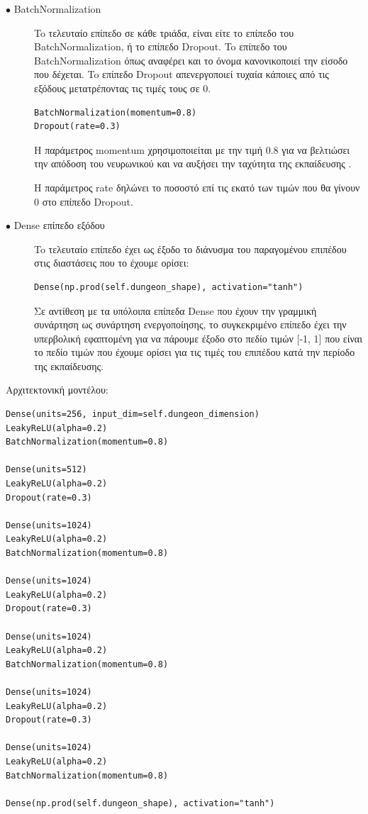 \begin{description}
\item[$\bullet$ BatchNormalization] To τελευταίο επίπεδο σε κάθε τριάδα, είναι είτε το επίπεδο του BatchNormalization, ή το επίπεδο Dropout. To επίπεδο του BatchNormalization όπως αναφέρει και το όνομα κανονικοποιεί την είσοδο που δέχεται. To επίπεδο Dropout απενεργοποιεί τυχαία κάποιες από τις εξόδους μετατρέποντας τις τιμές τους σε 0.
\par
\begin{verbatim}
BatchNormalization(momentum=0.8)
Dropout(rate=0.3)
\end{verbatim}
\par
Η παράμετρος momentum χρησιμοποιείται με την τιμή 0.8 για να βελτιώσει την απόδοση του νευρωνικού και να αυξήσει την ταχύτητα της εκπαίδευσης \cite{firstgan}. 
\par
H παράμετρος rate δηλώνει το ποσοστό επί τις εκατό των τιμών που θα γίνουν 0 στο επίπεδο Dropout.
\end{description}

\begin{description}
\item[$\bullet$ Dense επίπεδο εξόδου] To τελευταίο επίπεδο έχει ως έξοδο το διάνυσμα του παραγομένου επιπέδου στις διαστάσεις που το έχουμε ορίσει:
\par
\begin{verbatim}
Dense(np.prod(self.dungeon_shape), activation="tanh")
\end{verbatim}
\par
Σε αντίθεση με τα υπόλοιπα επίπεδα Dense που έχουν την γραμμική συνάρτηση ως συνάρτηση ενεργοποίησης, το συγκεκριμένο επίπεδο έχει την υπερβολική εφαπτομένη για να πάρουμε έξοδο στο πεδίο τιμών [-1, 1] που είναι το πεδίο τιμών που έχουμε ορίσει για τις τιμές του επιπέδου κατά την περίοδο της εκπαίδευσης.
\end{description}

\par
Αρχιτεκτονική μοντέλου:
\begin{verbatim}
Dense(units=256, input_dim=self.dungeon_dimension)
LeakyReLU(alpha=0.2)
BatchNormalization(momentum=0.8)

Dense(units=512)
LeakyReLU(alpha=0.2)
Dropout(rate=0.3)

Dense(units=1024)
LeakyReLU(alpha=0.2)
BatchNormalization(momentum=0.8)

Dense(units=1024)
LeakyReLU(alpha=0.2)
Dropout(rate=0.3)

Dense(units=1024)
LeakyReLU(alpha=0.2)
BatchNormalization(momentum=0.8)

Dense(units=1024)
LeakyReLU(alpha=0.2)
Dropout(rate=0.3)

Dense(units=1024)
LeakyReLU(alpha=0.2)
BatchNormalization(momentum=0.8)

Dense(np.prod(self.dungeon_shape), activation="tanh")
\end{verbatim}

